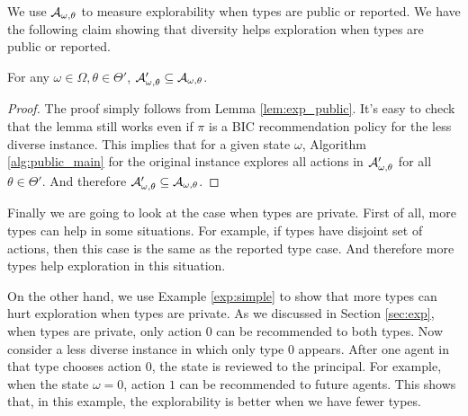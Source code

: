 We use $\mathcal{A}_{\omega,\theta}$ to measure explorability when types are public or reported. We have the following claim showing that diversity helps exploration when types are public or reported.

\begin{claim}
For any $\omega \in \varOmega, \theta \in \varTheta'$, $\mathcal{A}'_{\omega,\theta} \subseteq \mathcal{A}_{\omega,\theta}$.
\end{claim}

\begin{proof}
The proof simply follows from Lemma \ref{lem:exp_public}. It's easy to check that the lemma still works even if $\pi$ is a BIC recommendation policy for the less diverse instance. This implies that for a given state $\omega$, Algorithm \ref{alg:public_main} for the original instance explores all actions in $\mathcal{A}'_{\omega,\theta}$ for all $\theta \in \varTheta'$. And therefore $\mathcal{A}'_{\omega,\theta} \subseteq \mathcal{A}_{\omega,\theta}$.
\end{proof}

Finally we are going to look at the case when types are private. First of all, more types can help in some situations. For example, if types have disjoint set of actions, then this case is the same as the reported type case. And therefore more types help exploration in this situation.

On the other hand, we use Example \ref{exp:simple} to show that more types can hurt exploration when types are private. As we discussed in Section \ref{sec:exp}, when types are private, only action 0 can be recommended to both types. Now consider a less diverse instance in which only type 0 appears. After one agent in that type chooses action 0, the state is reviewed to the principal. For example, when the state $\omega = 0$, action $1$ can be recommended to future agents. This shows that,  in this example, the explorability is better when we have fewer types. 